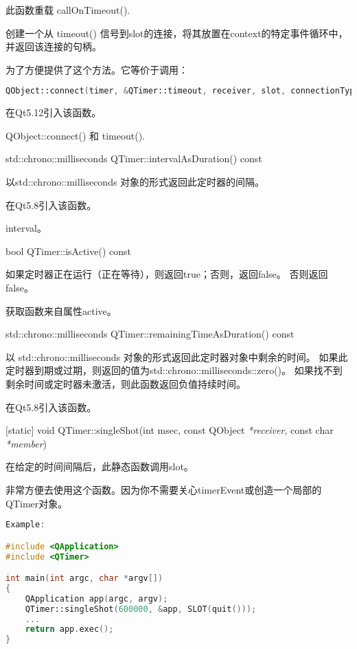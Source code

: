 此函数重载 callOnTimeout().

创建一个从 timeout() 信号到slot的连接，将其放置在context的特定事件循环中，并返回该连接的句柄。

为了方便提供了这个方法。它等价于调用：


\begin{lstlisting}[language=C++]
QObject::connect(timer, &QTimer::timeout, receiver, slot, connectionType).
\end{lstlisting}
	
在Qt5.12引入该函数。
	
\begin{seeAlso}
QObject::connect() 和 timeout().
\end{seeAlso}

% 
std::chrono::milliseconds QTimer::intervalAsDuration() const

以std::chrono::milliseconds 对象的形式返回此定时器的间隔。

在Qt5.8引入该函数。

\begin{seeAlso}
interval。
\end{seeAlso}

bool QTimer::isActive() const

如果定时器正在运行（正在等待），则返回true；否则，返回false。 否则返回false。

\begin{notice}
获取函数来自属性active。
\end{notice}

std::chrono::milliseconds QTimer::remainingTimeAsDuration() const

以 std::chrono::milliseconds 对象的形式返回此定时器对象中剩余的时间。 
如果此定时器到期或过期，则返回的值为std::chrono::milliseconds::zero()。 
如果找不到剩余时间或定时器未激活，则此函数返回负值持续时间。

在Qt5.8引入该函数。

[static] void QTimer::singleShot(int msec, const QObject \emph{*receiver}, const char \emph{*member})

在给定的时间间隔后，此静态函数调用slot。

非常方便去使用这个函数。因为你不需要关心timerEvent或创造一个局部的QTimer对象。

\begin{lstlisting}[language=C++]
Example:

#include <QApplication>
#include <QTimer>

int main(int argc, char *argv[])
{
	QApplication app(argc, argv);
	QTimer::singleShot(600000, &app, SLOT(quit()));
	...
	return app.exec();
}
\end{lstlisting}

